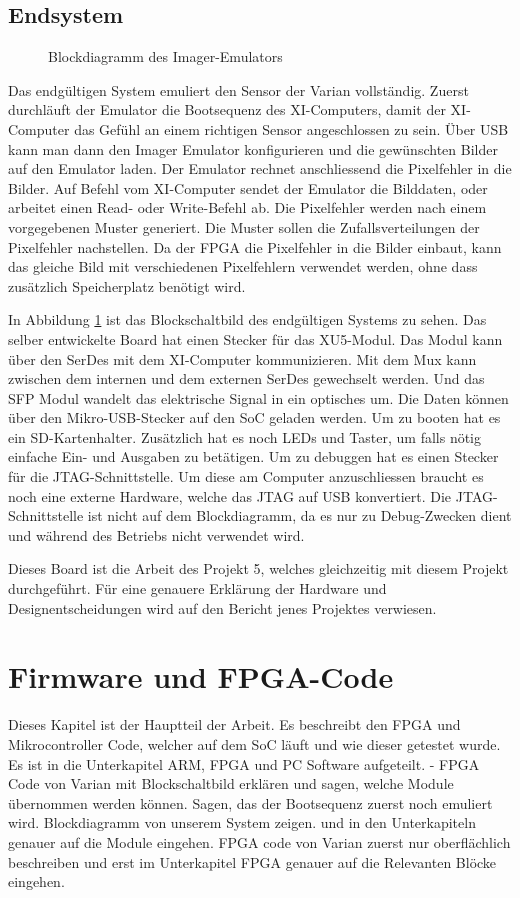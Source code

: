 \documentclass{article}
\begin{document}
\subsection{Endsystem}
\begin{figure}[tb]
    \caption{Blockdiagramm des Imager-Emulators}
    \label{fig:bd_top}
\end{figure}

Das endgültigen System emuliert den Sensor der Varian vollständig. Zuerst durchläuft der Emulator die Bootsequenz des XI-Computers, damit der XI-Computer das Gefühl an einem richtigen Sensor angeschlossen zu sein. Über USB kann man dann den Imager Emulator konfigurieren und die gewünschten Bilder auf den Emulator laden. Der Emulator rechnet anschliessend die Pixelfehler in die Bilder. Auf Befehl vom XI-Computer sendet der Emulator die Bilddaten, oder arbeitet einen Read- oder Write-Befehl ab. Die Pixelfehler werden nach einem vorgegebenen Muster generiert. Die Muster sollen die Zufallsverteilungen der Pixelfehler nachstellen. Da der FPGA die Pixelfehler in die Bilder einbaut, kann das gleiche Bild mit verschiedenen Pixelfehlern verwendet werden, ohne dass zusätzlich Speicherplatz benötigt wird.

In Abbildung \ref{fig:bd_top} ist das Blockschaltbild des endgültigen Systems zu sehen. Das selber entwickelte Board hat einen Stecker für das XU5-Modul. Das Modul kann über den SerDes mit dem XI-Computer kommunizieren. Mit dem Mux kann zwischen dem internen und dem externen SerDes gewechselt werden. Und das SFP Modul wandelt das elektrische Signal in ein optisches um. Die Daten können über den Mikro-USB-Stecker auf den SoC geladen werden. Um zu booten hat es ein SD-Kartenhalter. Zusätzlich hat es noch LEDs und Taster, um falls nötig einfache Ein- und Ausgaben zu betätigen. Um zu debuggen hat es einen Stecker für die JTAG-Schnittstelle. Um diese am Computer anzuschliessen braucht es noch eine externe Hardware, welche das JTAG auf USB konvertiert. Die JTAG-Schnittstelle ist nicht auf dem Blockdiagramm, da es nur zu Debug-Zwecken dient und während des Betriebs nicht verwendet wird. 

Dieses Board ist die Arbeit des Projekt 5, welches gleichzeitig mit diesem Projekt durchgeführt. Für eine genauere Erklärung der Hardware und Designentscheidungen wird auf den Bericht jenes Projektes verwiesen. 


\section{Firmware und FPGA-Code}
Dieses Kapitel ist der Hauptteil der Arbeit. Es beschreibt den FPGA und Mikrocontroller Code, welcher auf dem SoC läuft und wie dieser getestet wurde. Es ist in die Unterkapitel ARM, FPGA und PC Software aufgeteilt.
- FPGA Code von Varian mit Blockschaltbild erklären und sagen, welche Module übernommen werden können. Sagen, das der Bootsequenz zuerst noch emuliert wird.
Blockdiagramm von unserem System zeigen. und in den Unterkapiteln genauer auf die Module eingehen. FPGA code von Varian zuerst nur oberflächlich beschreiben und erst im Unterkapitel FPGA genauer auf die Relevanten Blöcke eingehen.
\end{document}
